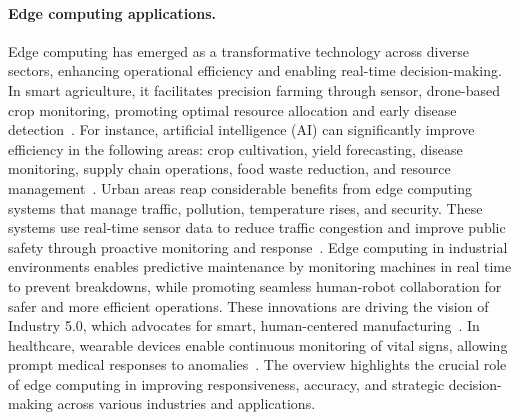 
\paragraph{Edge computing applications.}
Edge computing has emerged as a transformative technology across diverse sectors, enhancing operational efficiency and enabling real-time decision-making. In smart agriculture, it facilitates precision farming through sensor, drone-based crop monitoring, promoting optimal resource allocation and early disease detection~\cite{akhtar2021smart,junaidi2025deep,dhifaoui2022cloud}. For instance, artificial intelligence (AI) can significantly improve efficiency in the following areas: crop cultivation, yield forecasting, disease monitoring, supply chain operations, food waste reduction, and resource management~\cite{pandey2024towards}.
Urban areas reap considerable benefits from edge computing systems that manage traffic, pollution, temperature rises, and security. These systems use real-time sensor data to reduce traffic congestion and improve public safety through proactive monitoring and response~\cite{xu2023mobile,hossain2018edge}.
Edge computing in industrial environments enables predictive maintenance by monitoring machines in real time to prevent breakdowns, while promoting seamless human-robot collaboration for safer and more efficient operations. These innovations are driving the vision of Industry 5.0, which advocates for smart, human-centered manufacturing~\cite{sharma2024edge}.
In healthcare, wearable devices enable continuous monitoring of vital signs, allowing prompt medical responses to anomalies~\cite{rancea2024edge}. The overview highlights the crucial role of edge computing in improving responsiveness, accuracy, and strategic decision-making across various industries and applications.

